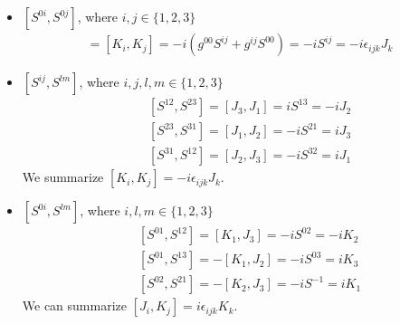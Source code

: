 \documentclass[11pt]{article}
\begin{document}
\section{ }
\begin{itemize}
  \item $[S^{0i},S^{0j}]$, where $i, j\in \{ 1,2,3\}$
  \begin{eqnarray}
    [S^{0i},S^{0j}]=[K_i,K_j]=-i(g^{00}S^{ij}+g^{ij}S^{00})=-iS^{ij}=-i\epsilon_{ijk}J_k
  \end{eqnarray}
  \item $[S^{ij},S^{lm}]$, where $i, j, l, m \in \{ 1,2,3\}$
  \begin{eqnarray}
    &&[S^{12},S^{23}]=[J_3,J_1]=iS^{13}=-iJ_2 \\
    &&[S^{23},S^{31}]=[J_1,J_2]=-iS^{21}=iJ_3 \\
    &&[S^{31},S^{12}]=[J_2,J_3]=-iS^{32}=iJ_1
  \end{eqnarray}
  We summarize $[K_i,K_j]=-i\epsilon_{ijk}J_k$.
  \item $[S^{0i},S^{lm}]$, where $i, l, m \in \{ 1,2,3\}$
  \begin{eqnarray}
    &&[S^{01},S^{12}]=[K_1,J_3]=-iS^{02}=-iK_2 \\
    &&[S^{01},S^{13}]=-[K_1,J_2]=-iS^{03}=iK_3 \\
    &&[S^{02},S^{21}]=-[K_2,J_3]=-iS^{-1}=iK_1
  \end{eqnarray}
  We can summarize $[J_i,K_j]=i\epsilon_{ijk}K_k$.
\end{itemize}
\end{document}
